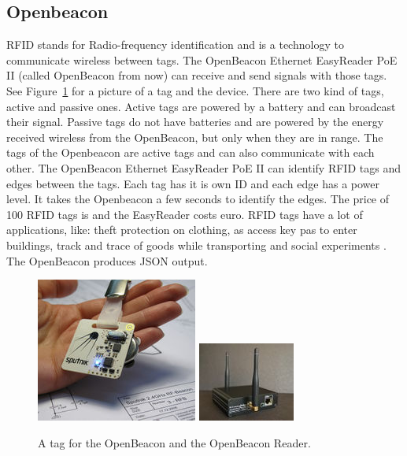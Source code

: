 	\subsection{Openbeacon}
	RFID stands for Radio-frequency identification and is a technology to communicate wireless between tags. The OpenBeacon Ethernet EasyReader PoE II (called OpenBeacon from now) can receive and send signals with those tags. See Figure~\ref{fig:openbeacon} for a picture of a tag and the device. There are two kind of tags, active and passive ones. Active tags are powered by a battery and can broadcast their signal. Passive tags do not have batteries and are powered by the energy received wireless from the OpenBeacon, but only when they are in range. The tags of the Openbeacon are active tags and can also communicate with each other. The OpenBeacon Ethernet EasyReader PoE II can identify RFID tags and edges between the tags. Each tag has it is own ID and each edge has a power level. It takes the Openbeacon a few seconds to identify the edges. The price of 100 RFID tags is  and the EasyReader costs  euro. RFID tags have a lot of applications, like: theft protection on clothing, as access key pas to enter buildings, track and trace of goods while transporting and social experiments \cite{2008arXiv0811.4170B} \cite{socialrfid}. The OpenBeacon produces JSON output.


			\begin{figure}[h]
				\label{fig:openbeacon}
				\centering
					\includegraphics[scale=0.5]{tag.jpg}
					\includegraphics[scale=1.0]{reader.jpg}
					
					\caption{A tag for the OpenBeacon \cite{openbeacon} and the OpenBeacon Reader.}

			\end{figure}


